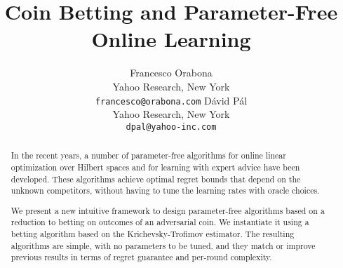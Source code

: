 \documentclass{article}
\author{
  Francesco Orabona\\
  Yahoo Research, New York\\
  \texttt{francesco@orabona.com}
  \And
  D\'avid P\'al\\
  Yahoo Research, New York\\
  \texttt{dpal@yahoo-inc.com}
}
\title{Coin Betting and Parameter-Free Online Learning}
\begin{document}
\maketitle

\begin{abstract}
In the recent years, a number of parameter-free algorithms for online linear
optimization over Hilbert spaces and for learning with expert advice have been
developed. These algorithms achieve optimal regret bounds that depend on the
unknown competitors, without having to tune the learning rates with oracle
choices.

We present a new intuitive framework to design parameter-free algorithms based
on a reduction to betting on outcomes of an adversarial coin. We instantiate it
using a betting algorithm based on the Krichevsky-Trofimov estimator.  The
resulting algorithms are simple, with no parameters to be tuned, and they match
or improve previous results in terms of regret guarantee and per-round
complexity.
\end{abstract}

\vspace{-0.2cm}












\begin{small}
\newpage
\setlength{\bibsep}{0pt}


\end{small}

\appendix





\end{document}
